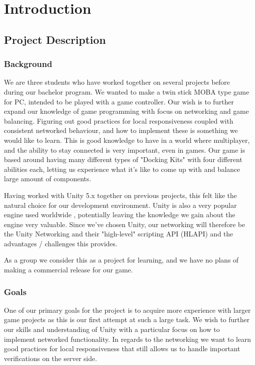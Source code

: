 \chapter{Introduction}
\label{chap:introduction}

\section{Project Description}
\subsection{Background}

We are three students who have worked together on several projects before during our bachelor program. We wanted to make a twin stick MOBA type game for PC, intended to be played with a game controller. Our wish is to further expand our knowledge of game programming with focus on networking and game balancing. Figuring out good practices for local responsiveness coupled with consistent networked behaviour, and how to implement these is something we would like to learn. This is good knowledge to have in a world where multiplayer, and the ability to stay connected is very important, even in games. Our game is based around having many different types of "Docking Kits" with four different abilities each, letting us experience what it's like to come up with and balance large amount of components.

Having worked with Unity 5.x together on previous projects, this felt like the natural choice for our development environment. Unity is also a very popular engine used worldwide \cite{unityUsageStatistics}, potentially leaving the knowledge we gain about the engine very valuable. Since we've chosen Unity, our networking will therefore be the Unity Networking and their "high-level" scripting API (HLAPI) \cite{unityUNETManual} and the advantages / challenges this provides.

As a group we consider this as a project for learning, and we have no plans of making a commercial release for our game. 

\subsection{Goals}
One of our primary goals for the project is to acquire more experience with larger game projects as this is our first attempt at such a large task. We wish to further our skills and understanding of Unity with a particular focus on how to implement networked functionality. 
In regards to the networking we want to learn good practices for local responsiveness that still allows us to handle important verifications on the server side. 

